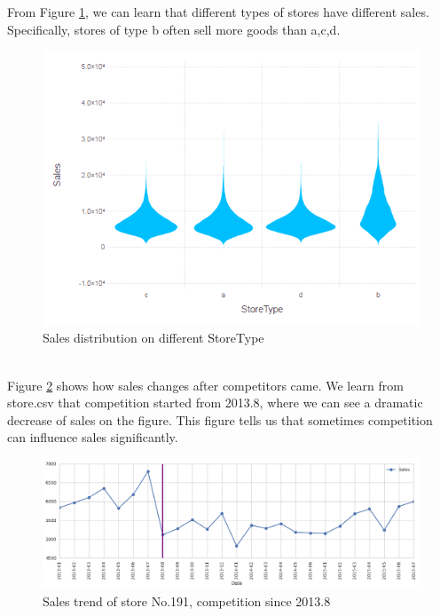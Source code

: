 \documentclass[11pt]{article}
\begin{document}
From Figure \ref{fig:storetype}, we can learn that different types of stores have different sales. Specifically, stores of type b often sell more goods than a,c,d. \\
\begin{figure}[h!]
  \centering
  \includegraphics[scale=0.5]{StoreType.PNG}
  \caption{Sales distribution on different StoreType}
  \label{fig:storetype}
\end{figure}\\
Figure \ref{fig:competition} shows how sales changes after competitors came. We learn from store.csv that competition started from 2013.8, where we can see a dramatic decrease of sales on the figure. This figure tells us that sometimes competition can influence sales significantly.\\
\begin{figure}[h!]
  \centering
  \includegraphics[scale=0.4]{competition.png}
  \caption{Sales trend of store No.191, competition since 2013.8}
  \label{fig:competition}
\end{figure}\\
\end{document}
